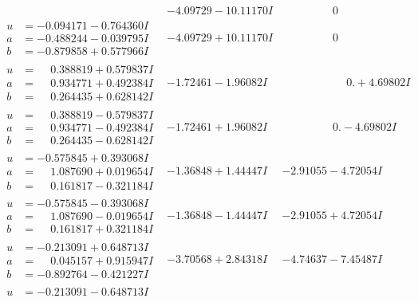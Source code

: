 \documentclass[1p]{elsarticle_modified}
\theoremstyle{definition}
\begin{document}
$$\begin{array}{c|c|c}
 & -4.09729 - 10.11170 I & \phantom{-0.000000 } 0 \\ \hline\begin{aligned}
u &= -0.094171 - 0.764360 I \\
a &= -0.488244 - 0.039795 I \\
b &= -0.879858 + 0.577966 I\end{aligned}
 & -4.09729 + 10.11170 I & \phantom{-0.000000 } 0 \\ \hline\begin{aligned}
u &= \phantom{-}0.388819 + 0.579837 I \\
a &= \phantom{-}0.934771 + 0.492384 I \\
b &= \phantom{-}0.264435 + 0.628142 I\end{aligned}
 & -1.72461 - 1.96082 I & \phantom{-0.000000 -}0. + 4.69802 I \\ \hline\begin{aligned}
u &= \phantom{-}0.388819 - 0.579837 I \\
a &= \phantom{-}0.934771 - 0.492384 I \\
b &= \phantom{-}0.264435 - 0.628142 I\end{aligned}
 & -1.72461 + 1.96082 I & \phantom{-0.000000 } 0. - 4.69802 I \\ \hline\begin{aligned}
u &= -0.575845 + 0.393068 I \\
a &= \phantom{-}1.087690 + 0.019654 I \\
b &= \phantom{-}0.161817 - 0.321184 I\end{aligned}
 & -1.36848 + 1.44447 I & -2.91055 - 4.72054 I \\ \hline\begin{aligned}
u &= -0.575845 - 0.393068 I \\
a &= \phantom{-}1.087690 - 0.019654 I \\
b &= \phantom{-}0.161817 + 0.321184 I\end{aligned}
 & -1.36848 - 1.44447 I & -2.91055 + 4.72054 I \\ \hline\begin{aligned}
u &= -0.213091 + 0.648713 I \\
a &= \phantom{-}0.045157 + 0.915947 I \\
b &= -0.892764 - 0.421227 I\end{aligned}
 & -3.70568 + 2.84318 I & -4.74637 - 7.45487 I \\ \hline\begin{aligned}
u &= -0.213091 - 0.648713 I \\

\end{aligned}
\end{array}$$
\end{document}
